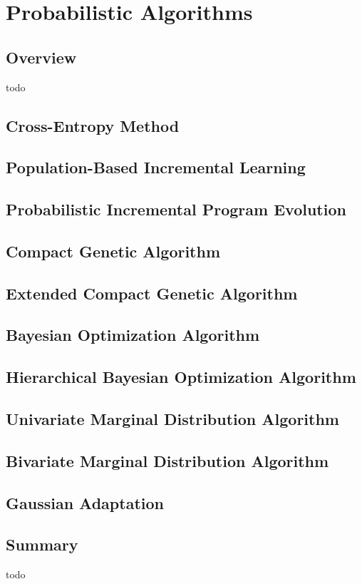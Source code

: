


\chapter{Probabilistic Algorithms}
\label{ch:probabilistic}

\section{Overview}
todo

\newpage\section{Cross-Entropy Method}
\newpage\section{Population-Based Incremental Learning}
\newpage\section{Probabilistic Incremental Program Evolution}
\newpage\section{Compact Genetic Algorithm}
\newpage\section{Extended Compact Genetic Algorithm}
\newpage\section{Bayesian Optimization Algorithm}
\newpage\section{Hierarchical Bayesian Optimization Algorithm}
\newpage\section{Univariate Marginal Distribution Algorithm}
\newpage\section{Bivariate Marginal Distribution Algorithm}
\newpage\section{Gaussian Adaptation}
\newpage

\section{Summary}
todo
